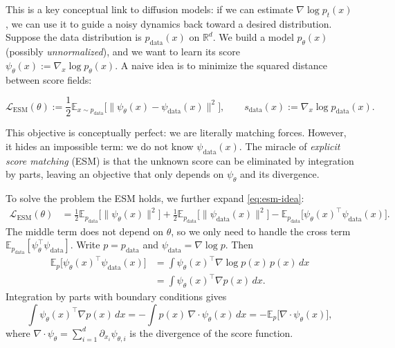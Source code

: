 \documentclass[../main]{subfiles}
\begin{document}
This is a key conceptual link to diffusion models: if we can estimate $\nabla\log p_t(x)$, we can
use it to guide a noisy dynamics back toward a desired distribution. Suppose the data distribution is $p_{\mathrm{data}}(x)$ on $\mathbb R^d$.
We build a model $p_\theta(x)$ (possibly \emph{unnormalized}), and we want to learn its score $\psi_\theta(x) := \nabla_x \log p_\theta(x).$
A naive idea is to minimize the squared distance between score fields:
\begin{theorem}
\begin{equation}\label{eq:esm-idea}
    \mathcal L_{\mathrm{ESM}}(\theta)
    := \frac12 \mathbb E_{x\sim p_{\mathrm{data}}}\Big[ \| \psi_\theta(x) - \psi_{\mathrm{data}}(x)\|^2 \Big],
    \qquad s_{\mathrm{data}}(x):=\nabla_x\log p_{\mathrm{data}}(x).
\end{equation}
\end{theorem}
This objective is conceptually perfect: we are literally matching forces.
However, it hides an impossible term: we do not know $\psi_{\mathrm{data}}(x)$. The miracle of \emph{explicit score matching} (ESM) is that the unknown score can be eliminated
by integration by parts, leaving an objective that only depends on $\psi_\theta$ and its divergence.

To solve the problem the ESM holds, we further expand \eqref{eq:esm-idea}:
\begin{align}
    \mathcal L_{\mathrm{ESM}}(\theta)
    &= \frac12 \mathbb E_{p_{\mathrm{data}}}\big[\|\psi_\theta(x)\|^2\big]
     + \frac12 \mathbb E_{p_{\mathrm{data}}}\big[\|\psi_{\mathrm{data}}(x)\|^2\big]
     - \mathbb E_{p_{\mathrm{data}}}\big[\psi_\theta(x)^\top \psi_{\mathrm{data}}(x)\big].
\end{align}
The middle term does not depend on $\theta$, so we only need to handle the cross term
\(\mathbb E_{p_{\mathrm{data}}}[\psi_\theta^\top \psi_{\mathrm{data}}]\).
Write $p=p_{\mathrm{data}}$ and $\psi_{\mathrm{data}}=\nabla \log p$.
Then
\begin{align}
    \mathbb E_{p}\big[\psi_\theta(x)^\top \psi_{\mathrm{data}}(x)\big]
    &= \int \psi_\theta(x)^\top \nabla \log p(x)\, p(x)\,dx \\
    &= \int \psi_\theta(x)^\top \nabla p(x)\,dx.
\end{align}
Integration by parts with boundary conditions gives
\begin{equation}\label{eq:ibp-key}
    \int \psi_\theta(x)^\top \nabla p(x)\,dx
    = - \int p(x)\, \nabla\cdot \psi_\theta(x)\,dx
    = -\mathbb E_{p}\big[\nabla\cdot \psi_\theta(x)\big],
\end{equation}
where $\nabla\cdot \psi_\theta = \sum_{i=1}^d \partial_{x_i} \psi_{\theta,i}$ is the divergence of the score function.
\end{document}
